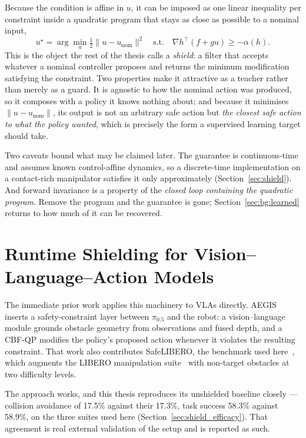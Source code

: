 \documentclass[a4paper,11pt]{report}
\begin{document}
Because the condition is affine in $u$, it can be imposed as one linear inequality per constraint
inside a quadratic program that stays as close as possible to a nominal input,
\begin{equation}
  u^{\star} = \arg\min_{u} \tfrac{1}{2}\lVert u - u_{\mathrm{nom}} \rVert^{2}
  \quad \text{s.t.} \quad
  \nabla h^{\top}\!\left(f + gu\right) \ge -\alpha(h).
  \label{eq:cbf_qp}
\end{equation}
This is the object the rest of the thesis calls a \emph{shield}: a filter that accepts whatever a
nominal controller proposes and returns the minimum modification satisfying the constraint. Two
properties make it attractive as a teacher rather than merely as a guard. It is agnostic to how the
nominal action was produced, so it composes with a policy it knows nothing about; and because it
minimises $\lVert u - u_{\mathrm{nom}} \rVert$, its output is not an arbitrary safe action but
\emph{the closest safe action to what the policy wanted}, which is precisely the form a supervised
learning target should take.

Two caveats bound what may be claimed later. The guarantee is continuous-time and assumes known
control-affine dynamics, so a discrete-time implementation on a contact-rich manipulator satisfies
it only approximately (Section~\ref{sec:shield}). And forward invariance is a property of the
\emph{closed loop containing the quadratic program}. Remove the program and the guarantee is gone;
Section~\ref{sec:bg:learned} returns to how much of it can be recovered.

\section{Runtime Shielding for Vision--Language--Action Models}\label{sec:bg:shielding}

The immediate prior work applies this machinery to VLAs directly. AEGIS inserts a safety-constraint
layer between $\pi_{0.5}$ and the robot: a vision--language module grounds obstacle geometry from
observations and fused depth, and a CBF-QP modifies the policy's proposed action whenever it
violates the resulting constraint. That work also contributes SafeLIBERO, the benchmark used
here~\cite{vlsa2026}, which augments the LIBERO manipulation suite~\cite{liu2023libero} with
non-target obstacles at two difficulty levels.

The approach works, and this thesis reproduces its unshielded baseline closely --- collision
avoidance of 17.5\% against their 17.3\%, task success 58.3\% against 58.9\%, on the three suites
used here (Section~\ref{sec:shield_efficacy}). That agreement is real external validation of the
setup and is reported as such.
\end{document}
